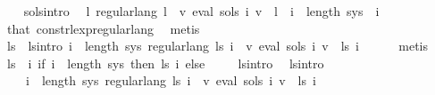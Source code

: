 \begin{isabellebody}
\ \ \isamarkupfalse%
\ sols{\isacharunderscore}{\kern0pt}intro\ \isamarkupfalse%
\ {\isachardoublequoteopen}{\isasymexists}l{\isachardot}{\kern0pt}\ regular{\isacharunderscore}{\kern0pt}lang\ l\ {\isasymand}\ {\isacharparenleft}{\kern0pt}{\isasymforall}v{\isachardot}{\kern0pt}\ eval\ {\isacharparenleft}{\kern0pt}sols\ i{\isacharparenright}{\kern0pt}\ v\ {\isacharequal}{\kern0pt}\ l{\isacharparenright}{\kern0pt}{\isachardoublequoteclose}\ \ {\isachardoublequoteopen}i\ {\isacharless}{\kern0pt}\ length\ sys{\isachardoublequoteclose}\ \ i\isanewline
\ \ \ \ \isamarkupfalse%
\ that\ const{\isacharunderscore}{\kern0pt}rlexp{\isacharunderscore}{\kern0pt}regular{\isacharunderscore}{\kern0pt}lang\ \isamarkupfalse%
\ metis\isanewline
\ \ \isamarkupfalse%
\ \isamarkupfalse%
\ ls\ \ ls{\isacharunderscore}{\kern0pt}intro{\isacharcolon}{\kern0pt}\ {\isachardoublequoteopen}{\isasymforall}i\ {\isacharless}{\kern0pt}\ length\ sys{\isachardot}{\kern0pt}\ regular{\isacharunderscore}{\kern0pt}lang\ {\isacharparenleft}{\kern0pt}ls\ i{\isacharparenright}{\kern0pt}\ {\isasymand}\ {\isacharparenleft}{\kern0pt}{\isasymforall}v{\isachardot}{\kern0pt}\ eval\ {\isacharparenleft}{\kern0pt}sols\ i{\isacharparenright}{\kern0pt}\ v\ {\isacharequal}{\kern0pt}\ ls\ i{\isacharparenright}{\kern0pt}{\isachardoublequoteclose}\isanewline
\ \ \ \ \isamarkupfalse%
\ metis\isanewline
\ \ \isamarkupfalse%
\ {\isacharquery}{\kern0pt}ls{\isacharprime}{\kern0pt}\ {\isacharequal}{\kern0pt}\ {\isachardoublequoteopen}{\isasymlambda}i{\isachardot}{\kern0pt}\ if\ i\ {\isacharless}{\kern0pt}\ length\ sys\ then\ ls\ i\ else\ {\isacharbraceleft}{\kern0pt}{\isacharbraceright}{\kern0pt}{\isachardoublequoteclose}\isanewline
\ \ \isamarkupfalse%
\ ls{\isacharunderscore}{\kern0pt}intro\ \isamarkupfalse%
\ ls{\isacharprime}{\kern0pt}{\isacharunderscore}{\kern0pt}intro{\isacharcolon}{\kern0pt}\isanewline
\ \ \ \ {\isachardoublequoteopen}{\isacharparenleft}{\kern0pt}{\isasymforall}i\ {\isacharless}{\kern0pt}\ length\ sys{\isachardot}{\kern0pt}\ regular{\isacharunderscore}{\kern0pt}lang\ {\isacharparenleft}{\kern0pt}{\isacharquery}{\kern0pt}ls{\isacharprime}{\kern0pt}\ i{\isacharparenright}{\kern0pt}\ {\isasymand}\ {\isacharparenleft}{\kern0pt}{\isasymforall}v{\isachardot}{\kern0pt}\ eval\ {\isacharparenleft}{\kern0pt}sols\ i{\isacharparenright}{\kern0pt}\ v\ {\isacharequal}{\kern0pt}\ {\isacharquery}{\kern0pt}ls{\isacharprime}{\kern0pt}\ i{\isacharparenright}{\kern0pt}{\isacharparenright}{\kern0pt}\isanewline

\end{isabellebody}
